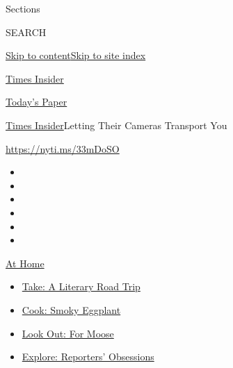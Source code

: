 Sections

SEARCH

\protect\hyperlink{site-content}{Skip to
content}\protect\hyperlink{site-index}{Skip to site index}

\href{https://www.nytimes3xbfgragh.onion/section/reader-center}{Times
Insider}

\href{https://myaccount.nytimes3xbfgragh.onion/auth/login?response_type=cookie\&client_id=vi}{}

\href{https://www.nytimes3xbfgragh.onion/section/todayspaper}{Today's
Paper}

\href{/section/reader-center}{Times Insider}\textbar{}Letting Their
Cameras Transport You

\url{https://nyti.ms/33mDoSO}

\begin{itemize}
\item
\item
\item
\item
\item
\item
\end{itemize}

\href{https://www.nytimes3xbfgragh.onion/spotlight/at-home?action=click\&pgtype=Article\&state=default\&region=TOP_BANNER\&context=at_home_menu}{At
Home}

\begin{itemize}
\tightlist
\item
  \href{https://www.nytimes3xbfgragh.onion/2020/07/28/books/time-for-a-literary-road-trip.html?action=click\&pgtype=Article\&state=default\&region=TOP_BANNER\&context=at_home_menu}{Take:
  A Literary Road Trip}
\item
  \href{https://www.nytimes3xbfgragh.onion/2020/07/29/magazine/bored-with-your-home-cooking-some-smoky-eggplant-will-fix-that.html?action=click\&pgtype=Article\&state=default\&region=TOP_BANNER\&context=at_home_menu}{Cook:
  Smoky Eggplant}
\item
  \href{https://www.nytimes3xbfgragh.onion/2020/07/27/travel/moose-michigan-isle-royale.html?action=click\&pgtype=Article\&state=default\&region=TOP_BANNER\&context=at_home_menu}{Look
  Out: For Moose}
\item
  \href{https://www.nytimes3xbfgragh.onion/interactive/2020/at-home/even-more-reporters-editors-diaries-lists-recommendations.html?action=click\&pgtype=Article\&state=default\&region=TOP_BANNER\&context=at_home_menu}{Explore:
  Reporters' Obsessions}
\end{itemize}

